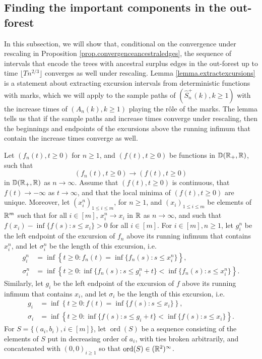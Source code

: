 \subsection{Finding the important components in the out-forest}\label{subsec.componentswithancestral}

In this subsection, we will show that, conditional on the convergence under rescaling in Proposition \ref{prop.convergenceancestraledges}, the sequence of intervals that encode the trees with ancestral surplus edges in the out-forest up to time $\lfloor Tn^{2/3}\rfloor $ converges as well under rescaling. Lemma \ref{lemma.extractexcursions} is a statement about extracting excursion intervals from deterministic functions with marks, which we will apply to the sample paths of $(\hat{S}_n^{+}(k),k\geq 1)$ with the increase times of $(A_n(k),k\geq 1)$ playing the rôle of the marks. The lemma tells us that if the sample paths and increase times converge under rescaling, then the beginnings and endpoints of the excursions above the running infimum that contain the increase times converge as well. 

Let $(f_n(t), t\geq 0)$ for $n\geq 1$, and $(f(t),t\geq 0)$ be functions in ${\mathbb D}({\mathbb R}_+,{\mathbb R})$, such that 
$$(f_n(t), t\geq 0)\to (f(t),t\geq 0)$$ in ${\mathbb D}({\mathbb R}_+,{\mathbb R})$ as $n\to \infty$. Assume that $(f(t),t\geq 0)$ is continuous, that $f(t)\to -\infty$ as $t\to \infty$, and that the local minima of $(f(t),t\geq 0)$ are unique. Moreover, let $(x_i^n)_{1\leq i\leq m}$, for $n\geq 1$, and $(x_i)_{1\leq i\leq m}$ be elements of ${\mathbb R}^{m}$ such that for all $i\in [m]$, $x_i^n\to x_i$ in ${\mathbb R}$ as $n\to \infty$, and such that $f(x_i)-\inf\{f(s):s\leq x_i\}>0$ for all $i\in [m]$. For $i \in [m], n \geq 1$, let $g_i^n$ be the left endpoint of the excursion of $f_n$ above its running infimum that contains $x_i^n$, and let $\sigma_i^n$ be the length of this excursion, i.e. 
\begin{align*}
    g_i^n&=\inf\left\{t\geq 0:f_n(t)=\inf\{f_n(s):s\leq x_i^n\}\right\}, \\
    \sigma_i^n&=\inf\left\{ t\geq 0: \inf\{f_n(s):s\leq g_i^n+t\} < \inf\{f_n(s):s\leq x_i^n\}\right\}.
\end{align*}
Similarly, let $g_i$ be the left endpoint of the excursion of $f$ above its running infimum that contains $x_i$, and let $\sigma_i$ be the length of this excursion, i.e. 
\begin{align*}
    g_i&=\inf\left\{t\geq 0:f(t)=\inf\{f(s):s\leq x_i\}\right\}, \\
    \sigma_i&=\inf\left\{ t\geq 0: \inf\{f(s):s\leq g_i+ t\} < \inf\{f(s):s\leq x_i\}\right\}.
\end{align*}
For $S=\{(a_i,b_i), i\in [m]\}$, let $\operatorname{ord}(S)$ be a sequence consisting of the elements of $S$ put in decreasing order of $a_i$, with ties broken arbitrarily, and concatenated with $(0,0)_{i\geq 1}$ so that $\operatorname{ord}(S)\in ({\mathbb R}^2)^\infty$.

